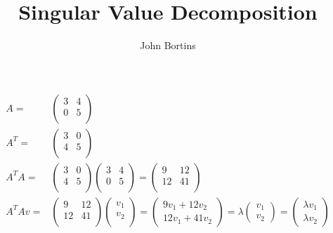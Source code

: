 \documentclass{article}
\title{Singular Value Decomposition}
\author{John Bortins}
\begin{document}
\maketitle{}

\begin{align*}
    A=      & \begin{pmatrix}
        3 & 4 \\0&5\\
    \end{pmatrix}                                                                                                                \\
    A^T=    & \begin{pmatrix}
        3 & 0 \\4&5\\
    \end{pmatrix}                                                                                                                \\
    A^T A=  & \begin{pmatrix}
        3 & 0 \\4&5\\
    \end{pmatrix}\begin{pmatrix}
        3 & 4 \\0&5\\
    \end{pmatrix}=\begin{pmatrix}
        9 & 12 \\12&41\\
    \end{pmatrix}                                                             \\
    A^T Av= & \begin{pmatrix}
        9 & 12 \\12&41\\
    \end{pmatrix}\begin{pmatrix}
        v_1 \\v_2\\
    \end{pmatrix}=\begin{pmatrix}
        9v_1 + 12v_2 \\12v_1 +41v_2
    \end{pmatrix}=\lambda\begin{pmatrix}
        v_1 \\v_2
    \end{pmatrix}=\begin{pmatrix}
        \lambda v_1 \\\lambda v_2
    \end{pmatrix} \\
\end{align*}
\end{document}
